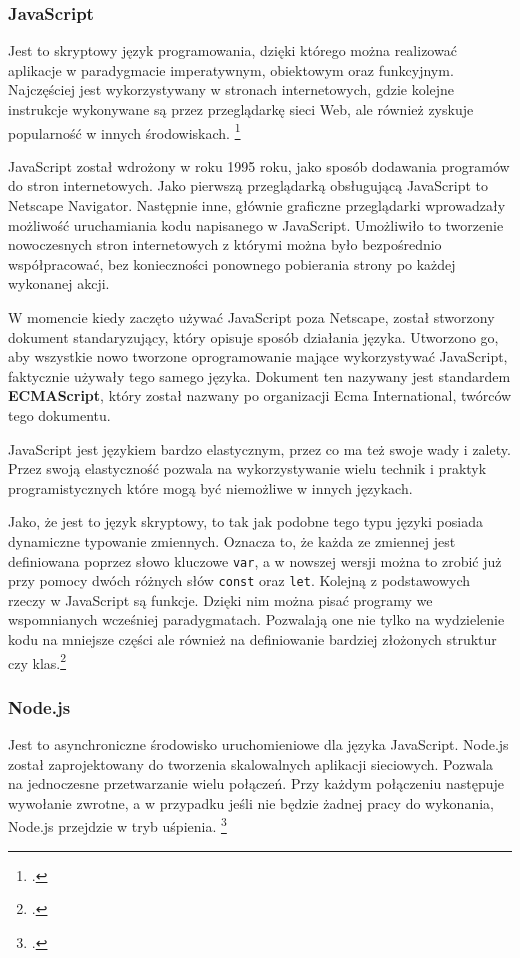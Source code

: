 \documentclass[a4paper]{article}
\begin{document}
\subsubsection{JavaScript}
Jest to skryptowy język programowania, dzięki którego można realizować aplikacje w paradygmacie imperatywnym, obiektowym oraz funkcyjnym. Najczęściej jest wykorzystywany w stronach internetowych, gdzie kolejne instrukcje wykonywane są przez przeglądarkę sieci Web, ale również zyskuje popularność w innych środowiskach. \footcite{aboutJS}
\par JavaScript został wdrożony w roku 1995 roku, jako sposób dodawania programów do stron internetowych. Jako pierwszą przeglądarką obsługującą JavaScript to Netscape Navigator. Następnie inne, głównie graficzne przeglądarki wprowadzały możliwość uruchamiania kodu napisanego w JavaScript. Umożliwiło to tworzenie nowoczesnych stron internetowych z którymi można było bezpośrednio współpracować, bez konieczności ponownego pobierania strony po każdej wykonanej akcji.
\par W momencie kiedy zaczęto używać JavaScript poza Netscape, został stworzony dokument standaryzujący, który opisuje sposób działania języka. Utworzono go, aby wszystkie nowo tworzone oprogramowanie mające wykorzystywać JavaScript, faktycznie używały tego samego języka. Dokument ten nazywany jest standardem \textbf{ECMAScript}, który został nazwany po organizacji Ecma International, twórców tego dokumentu.
\par JavaScript jest językiem bardzo elastycznym, przez co ma też swoje wady i zalety. Przez swoją elastyczność pozwala na wykorzystywanie wielu technik i praktyk programistycznych które mogą być niemożliwe w innych językach.
\par Jako, że jest to język skryptowy, to tak jak podobne tego typu języki posiada dynamiczne typowanie zmiennych. Oznacza to, że każda ze zmiennej jest definiowana poprzez słowo kluczowe \texttt{var}, a w nowszej wersji można to zrobić już przy pomocy dwóch różnych słów \texttt{const} oraz \texttt{let}. Kolejną z podstawowych rzeczy w JavaScript są funkcje. Dzięki nim można pisać programy we wspomnianych wcześniej paradygmatach. Pozwalają one nie tylko na wydzielenie kodu na mniejsze części ale również na definiowanie bardziej złożonych struktur czy klas.\footcite{EloquentJavaScript}

\subsubsection{Node.js}
Jest to asynchroniczne środowisko uruchomieniowe dla języka JavaScript. Node.js został zaprojektowany do tworzenia skalowalnych aplikacji sieciowych. Pozwala na jednoczesne przetwarzanie wielu połączeń. Przy każdym połączeniu następuje wywołanie zwrotne, a w przypadku jeśli nie będzie żadnej pracy do wykonania, Node.js przejdzie w tryb uśpienia.
\footcite{Node.js2017}
\end{document}
